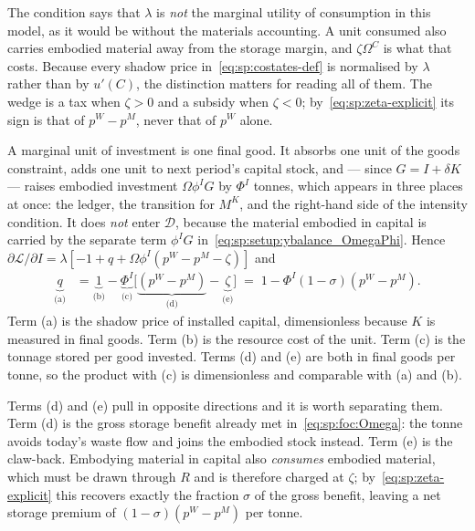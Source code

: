 The condition says that $\lambda$ is \emph{not} the marginal utility of consumption in this model, as it would be without the materials accounting. A unit consumed also carries embodied material away from the storage margin, and $\zeta\Omega^C$ is what that costs. Because every shadow price in~\eqref{eq:sp:costates-def} is normalised by $\lambda$ rather than by $u'\left(C\right)$, the distinction matters for reading all of them. The wedge is a tax when $\zeta>0$ and a subsidy when $\zeta<0$; by~\eqref{eq:sp:zeta-explicit} its sign is that of $p^W-p^M$, never that of $p^W$ alone.

 A marginal unit of investment is one final good. It absorbs one unit of the goods constraint, adds one unit to next period's capital stock, and --- since $G=I+\delta K$ --- raises embodied investment $\Omega\phi^IG$ by $\Phi^I$ tonnes, which appears in three places at once: the ledger, the transition for $M^K$, and the right-hand side of the intensity condition. It does \emph{not} enter $\mathcal D$, because the material embodied in capital is carried by the separate term $\phi^IG$ in~\eqref{eq:sp:setup:ybalance_OmegaPhi}. Hence $\partial\mathcal L/\partial I=\lambda\left[-1+q+\Omega\phi^I\left(p^W-p^M-\zeta\right)\right]$ and
\begin{align}
\underbrace{q}_{\text{(a)}} &= \underbrace{1}_{\text{(b)}}-\underbrace{\Phi^I}_{\text{(c)}}\Big[\underbrace{\left(p^W-p^M\right)}_{\text{(d)}}-\underbrace{\zeta}_{\text{(e)}}\Big]
\;=\;1-\Phi^I\left(1-\sigma\right)\left(p^W-p^M\right).
\label{eq:sp:foc:I}
\end{align}
Term (a) is the shadow price of installed capital, dimensionless because $K$ is measured in final goods. Term (b) is the resource cost of the unit. Term (c) is the tonnage stored per good invested. Terms (d) and (e) are both in final goods per tonne, so the product with (c) is dimensionless and comparable with (a) and (b).

Terms (d) and (e) pull in opposite directions and it is worth separating them. Term (d) is the gross storage benefit already met in~\eqref{eq:sp:foc:Omega}: the tonne avoids today's waste flow and joins the embodied stock instead. Term (e) is the claw-back. Embodying material in capital also \emph{consumes} embodied material, which must be drawn through $R$ and is therefore charged at $\zeta$; by~\eqref{eq:sp:zeta-explicit} this recovers exactly the fraction $\sigma$ of the gross benefit, leaving a net storage premium of $\left(1-\sigma\right)\left(p^W-p^M\right)$ per tonne.

